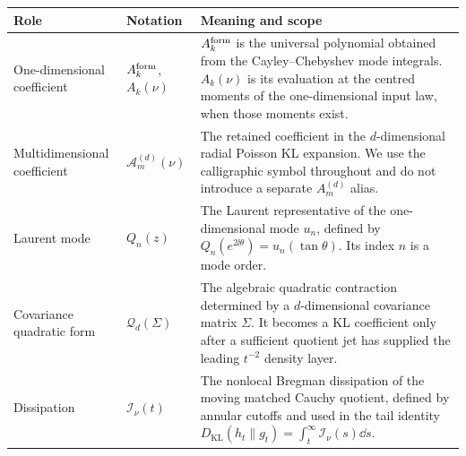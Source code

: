 \begin{center}
\begin{tabularx}{\textwidth}{@{}p{}p{}X@{}}
\textbf{Role} & \textbf{Notation} & \textbf{Meaning and scope} \\
\hline
One-dimensional coefficient &
\(A_k^{\rm form}\), \(A_k(\nu)\) &
\(A_k^{\rm form}\) is the universal polynomial obtained from the
Cayley--Chebyshev mode integrals.  \(A_k(\nu)\) is its evaluation at the
centred moments of the one-dimensional input law, when those moments exist. \\
Multidimensional coefficient &
\(\mathcal A_m^{(d)}(\nu)\) &
The retained coefficient in the \(d\)-dimensional radial Poisson KL expansion.
We use the calligraphic symbol throughout and do not introduce a separate
\(A_m^{(d)}\) alias. \\
Laurent mode &
\(Q_n(z)\) &
The Laurent representative of the one-dimensional mode \(u_n\), defined by
\(Q_n(e^{2\ii\theta})=u_n(\tan\theta)\).  Its index \(n\) is a mode order. \\
Covariance quadratic form &
\(\mathcal Q_d(\Sigma)\) &
The algebraic quadratic contraction determined by a \(d\)-dimensional
covariance matrix \(\Sigma\).  It becomes a KL coefficient only after a
sufficient quotient jet has supplied the leading \(t^{-2}\) density layer. \\
Dissipation &
\(\mathcal I_\nu(t)\) &
The nonlocal Bregman dissipation of the moving matched Cauchy quotient,
defined by annular cutoffs and used in the tail identity
\(D_{\mathrm{KL}}(h_t\|g_t)=\int_t^\infty\mathcal I_\nu(s)\dd s\). \\
\end{tabularx}
\end{center}
\fi
